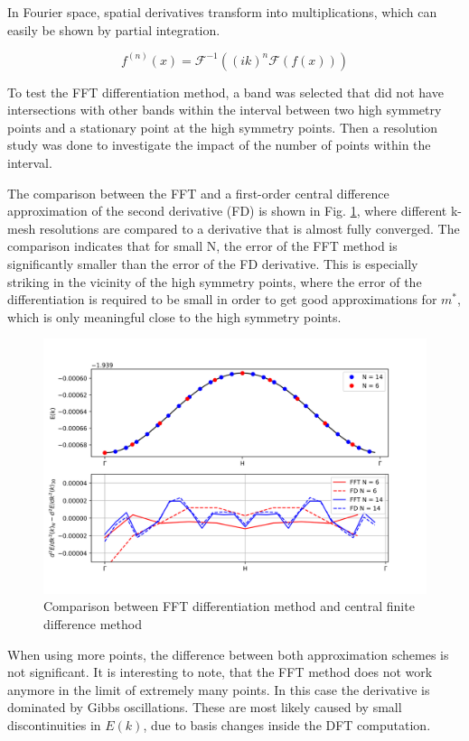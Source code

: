 In Fourier space, spatial derivatives transform into multiplications, which can easily be shown by partial integration.

\begin{equation}
    f^{(n)}(x) = \mathcal{F}^{-1}\left((ik)^n\mathcal{F}(f(x))\right)
\end{equation}
 
To test the FFT differentiation method, a band was selected that did not have intersections with other bands within the interval between two high symmetry points and a stationary point at the high symmetry points. Then a resolution study was done to investigate the impact of the number of points within the interval.

The comparison between the FFT and a first-order central difference approximation of the second derivative (FD) is shown in Fig. \ref{num_diff}, where different k-mesh resolutions are compared to a derivative that is almost fully converged. The comparison indicates that for small N, the error of the FFT method is significantly smaller than the error of the FD derivative. This is especially striking in the vicinity of the high symmetry points, where the error of the differentiation is required to be small in order to get good approximations for $m^{*}$, which is only meaningful close to the high symmetry points.


\begin{figure}[htb!]
    \centering
    \includegraphics[width=0.7\linewidth]{christian/diff_compare.png}
    \caption{Comparison between FFT differentiation method and central finite difference method}
    \label{num_diff}
\end{figure}

When using more points, the difference between both approximation schemes is not significant. It is interesting to note, that the FFT method does not work anymore in the limit of extremely many points. In this case the derivative is dominated by Gibbs oscillations. These are most likely caused by small discontinuities in $E(k)$, due to basis changes inside the DFT computation.

